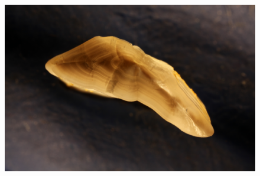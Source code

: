 \documentclass[10pt,letterpaper]{article}
\begin{document}
\begin{figure}[h!]
  \includegraphics[scale=0.015]{otolith/IMG_0459_2016_70021.JPG} 


\end{figure}
\end{document}
